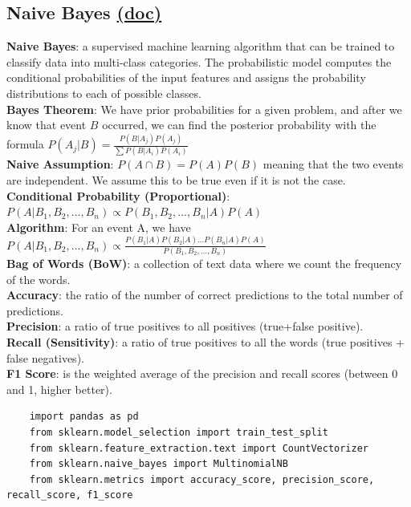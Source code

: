 \documentclass[11pt, a4paper]{article}
\begin{document}
\begin{spacing}{1.1}
	\subsection{Naive Bayes \href{https://scikit-learn.org/stable/modules/naive_bayes.html}{(doc)}}
	\textbf{Naive Bayes}: a supervised machine learning algorithm that can be trained to classify data into multi-class categories. The probabilistic model computes the conditional probabilities of the input features and assigns the probability distributions to each of possible classes. \vspace*{2mm}\\
	\textbf{Bayes Theorem}: We have prior probabilities for a given problem, and after we know that event $B$ occurred, we can find the posterior probability with the formula $ P(A_j|B) = \frac{P(B|A_j)P(A_j)}{\sum P(B|A_i)P(A_i)}$\vspace*{2mm}\\
	\textbf{Naive Assumption}: $P(A\cap B) = P(A)P(B)$ meaning that the two events are independent. We assume this to be true even if it is not the case. \vspace*{2mm}\\
	\textbf{Conditional Probability (Proportional)}: $P(A|B_1,B_2,...,B_n) \propto P(B_1,B_2,...,B_n|A)P(A)$\vspace*{2mm}\\
	\textbf{Algorithm}: For an event A, we have $ P(A|B_1,B_2,...,B_n) \propto \frac{P(B_1|A)P(B_2|A)...P(B_n|A)P(A)}{P(B_1,B_2,...,B_n)}$  \vspace*{2mm}\\
	\textbf{Bag of Words (BoW)}: a collection of text data where we count the frequency of the words. \vspace*{2mm}\\
	\textbf{Accuracy}: the ratio of the number of correct predictions to the total number of predictions.\vspace*{2mm}\\
	\textbf{Precision}: a ratio of true positives to all positives (true+false positive).\vspace*{2mm}\\
	\textbf{Recall (Sensitivity)}: a ratio of true positives to all the words (true positives + false negatives).\vspace*{2mm}\\
	\textbf{F1 Score}:  is the weighted average of the precision and recall scores (between 0 and 1, higher better).
	\begin{lstlisting}
	import pandas as pd
	from sklearn.model_selection import train_test_split
	from sklearn.feature_extraction.text import CountVectorizer
	from sklearn.naive_bayes import MultinomialNB
	from sklearn.metrics import accuracy_score, precision_score, recall_score, f1_score
	

\end{lstlisting}
\end{spacing}
\end{document}
